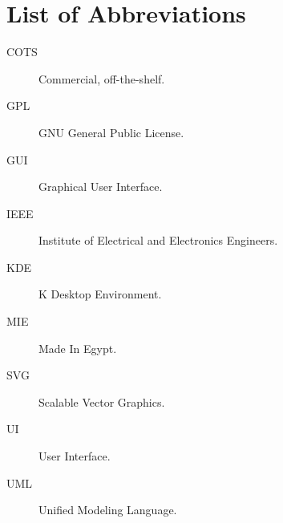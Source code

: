 \chapter*{List of Abbreviations}
\thispagestyle{plain}

\begin{description}
\item [COTS] Commercial, off-the-shelf.
\item [GPL] GNU General Public License.
\item [GUI] Graphical User Interface.
\item [IEEE] Institute of Electrical and Electronics Engineers.
\item [KDE] K Desktop Environment.
\item [MIE] Made In Egypt.
\item [SVG] Scalable Vector Graphics.
\item [UI] User Interface.
\item [UML] Unified Modeling Language.
\end{description}

